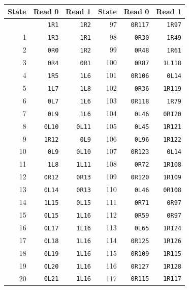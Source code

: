 \begingroup\small\setlength{\tabcolsep}{11pt}
\begin{longtable}{@{}rrr@{\hspace{20pt}}rrr@{}}
\toprule State & Read 0 & Read 1 & State & Read 0 & Read 1\\\midrule\endhead
\bottomrule\endfoot
0 & \texttt{1R1} & \texttt{1R2} & 97 & \texttt{0R117} & \texttt{1R97}\\
1 & \texttt{1R3} & \texttt{1R1} & 98 & \texttt{0R30} & \texttt{1R49}\\
2 & \texttt{0R0} & \texttt{1R2} & 99 & \texttt{0R48} & \texttt{1R61}\\
3 & \texttt{0R4} & \texttt{0R1} & 100 & \texttt{0R87} & \texttt{1L118}\\
4 & \texttt{1R5} & \texttt{1L6} & 101 & \texttt{0R106} & \texttt{0L14}\\
5 & \texttt{1L7} & \texttt{1L8} & 102 & \texttt{0R36} & \texttt{1R119}\\
6 & \texttt{0L7} & \texttt{1L6} & 103 & \texttt{0R118} & \texttt{1R79}\\
7 & \texttt{0L9} & \texttt{1L6} & 104 & \texttt{0L46} & \texttt{0R120}\\
8 & \texttt{0L10} & \texttt{0L11} & 105 & \texttt{0L45} & \texttt{1R121}\\
9 & \texttt{1R12} & \texttt{0L9} & 106 & \texttt{0L96} & \texttt{1R122}\\
10 & \texttt{0L9} & \texttt{0L10} & 107 & \texttt{0R123} & \texttt{0L14}\\
11 & \texttt{1L8} & \texttt{1L11} & 108 & \texttt{0R72} & \texttt{1R108}\\
12 & \texttt{0R12} & \texttt{0R13} & 109 & \texttt{0R120} & \texttt{1R109}\\
13 & \texttt{0L14} & \texttt{0R13} & 110 & \texttt{0L46} & \texttt{0R108}\\
14 & \texttt{1L15} & \texttt{0L15} & 111 & \texttt{0R71} & \texttt{0R97}\\
15 & \texttt{0L15} & \texttt{1L16} & 112 & \texttt{0R59} & \texttt{0R97}\\
16 & \texttt{0L17} & \texttt{1L16} & 113 & \texttt{0L65} & \texttt{1R124}\\
17 & \texttt{0L18} & \texttt{1L16} & 114 & \texttt{0R125} & \texttt{1R126}\\
18 & \texttt{0L19} & \texttt{1L16} & 115 & \texttt{0R109} & \texttt{1R115}\\
19 & \texttt{0L20} & \texttt{1L16} & 116 & \texttt{0R127} & \texttt{1R128}\\
20 & \texttt{0L21} & \texttt{1L16} & 117 & \texttt{0R115} & \texttt{1R117}\\

\end{longtable}
